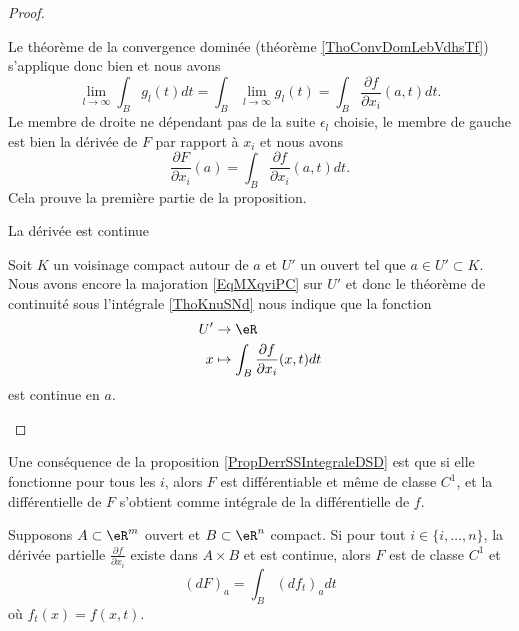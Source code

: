 \begin{proof}
\begin{subproof}
        Le théorème de la convergence dominée (théorème \ref{ThoConvDomLebVdhsTf}) s'applique donc bien et nous avons
        \begin{equation}
            \lim_{l\to \infty} \int_Bg_l(t)dt=\int_B\lim_{l\to \infty} g_l(t)=\int_B\frac{ \partial f }{ \partial x_i }(a,t)dt.
        \end{equation}
        Le membre de droite ne dépendant pas de la suite \( \epsilon_l\) choisie, le membre de gauche est bien la dérivée de \( F\) par rapport à \( x_i\) et nous avons
        \begin{equation}
            \frac{ \partial F }{ \partial x_i }(a)=\int_B\frac{ \partial f }{ \partial x_i }(a,t)dt.
        \end{equation}
        Cela prouve la première partie de la proposition.

    \item[La dérivée est continue]

        Soit \( K\) un voisinage compact autour de \( a\) et \( U'\) un ouvert tel que \( a\in U'\subset K\). Nous avons encore la majoration \eqref{EqMXqviPC} sur \( U'\) et donc le théorème de continuité sous l'intégrale \ref{ThoKnuSNd} nous indique que la fonction
        \begin{equation}
            \begin{aligned}
                U'&\to \eR \\
                x&\mapsto \int_{B}\frac{ \partial f }{ \partial x_i }(x,t)dt 
            \end{aligned}
        \end{equation}
        est continue en \( a\).
        
    \end{subproof}
\end{proof}

Une conséquence de la proposition \ref{PropDerrSSIntegraleDSD} est que si elle fonctionne pour tous les \( i\), alors \( F\) est différentiable et même de classe \( C^1\), et la différentielle de \( F\) s'obtient comme intégrale de la différentielle de \( f\).

\begin{proposition}\label{PropAOZkDsh}
    Supposons $A\subset\eR^m$ ouvert et $B\subset\eR^n$ compact. Si pour tout $i\in\{ i,\ldots,n \}$, la dérivée partielle $\frac{ \partial f }{ \partial x_i }$ existe dans $A\times B$ et est continue, alors \( F\) est de classe \( C^1\) et
    \begin{equation}
        (dF)_a=\int_B(df_t)_adt
    \end{equation}
    où \( f_t(x)=f(x,t)\).
\end{proposition}

